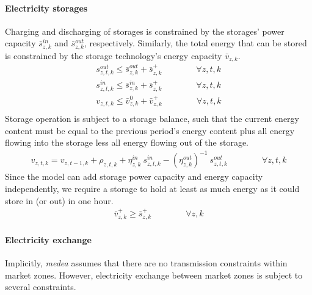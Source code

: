 \documentclass[11pt,a4paper]{article}
\begin{document}
\paragraph{Electricity storages}
Charging and discharging of storages is constrained by the storages' power capacity $\bar{s}^{in}_{z,k}$ and $\bar{s}^{out}_{z,k}$, respectively. Similarly, the total energy that can be stored is constrained by the storage technology's energy capacity $\bar{v}_{z,k}$.
\begin{align}
s^{out}_{z,t,k} \leq \bar{s}^{out}_{z,k} + \bar{s}^{+}_{z,k} \qquad \qquad \forall z,t,k \\
s^{in}_{z,t,k} \leq \bar{s}^{in}_{z,k} + \bar{s}^{+}_{z,k} \qquad \qquad \forall z,t,k \\
v_{z,t,k} \leq \bar{v}^{0}_{z,k} + \bar{v}^{+}_{z,k} \qquad \qquad \forall z,t,k \\
\end{align}
Storage operation is subject to a storage balance, such that the current energy content must be equal to the previous period's energy content plus all energy flowing into the storage less all energy flowing out of the storage.
\begin{align}
v_{z,t,k} = v_{z,t-1,k} + \rho_{z,t,k} + \eta^{in}_{z,k} \: s^{in}_{z,t,k} - (\eta^{out}_{z,k})^{-1} \: s^{out}_{z,t,k} \qquad \qquad \forall z,t,k
\end{align}
Since the model can add storage power capacity and energy capacity independently, we require a storage to hold at least as much energy as it could store in (or out) in one hour.
\begin{align}
\bar{v}^{+}_{z,k} \geq \bar{s}^{+}_{z,k} \qquad \qquad \forall z,k
\end{align}

\paragraph{Electricity exchange}
Implicitly, \emph{medea} assumes that there are no transmission constraints within market zones. 
However, electricity exchange between market zones is subject to several constraints.
\end{document}

